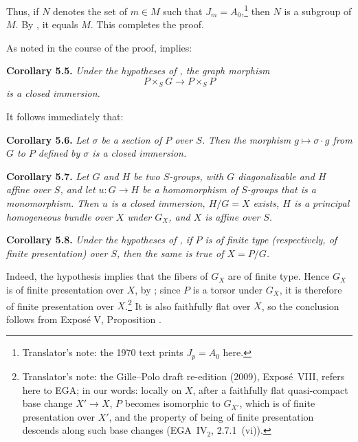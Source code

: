 Thus, if \(N\) denotes the set of \(m\in M\) such that
\(J_m=A_0\),\footnote{Translator's note: the 1970 text prints \(J_p=A_0\) here.} then
\(N\) is a subgroup of \(M\). By
, it equals \(M\). This
completes the proof.

As noted in the course of the proof,
 implies:

\medskip
\noindent{}\textbf{Corollary 5.5.}
\textit{Under the hypotheses of
, the graph morphism}
\[
  P\times_SG\longrightarrow P\times_SP
\]
\textit{is a closed immersion.}

It follows immediately that:

\medskip
\noindent{}\textbf{Corollary 5.6.}
\textit{Let \(\sigma\) be a section of \(P\) over \(S\). Then the
morphism \(g\mapsto\sigma\cdot g\) from \(G\) to \(P\) defined by
\(\sigma\) is a closed immersion.}

\medskip
\noindent{}\textbf{Corollary 5.7.}
\textit{Let \(G\) and \(H\) be two \(S\)-groups, with \(G\)
diagonalizable and \(H\) affine over \(S\), and let \(u:G\to H\) be a
homomorphism of \(S\)-groups that is a monomorphism. Then \(u\) is a
closed immersion, \(H/G=X\) exists, \(H\) is a principal homogeneous
bundle over \(X\) under \(G_X\), and \(X\) is affine over \(S\).}

\medskip
\noindent{}\textbf{Corollary 5.8.}
\textit{Under the hypotheses of
, if \(P\) is of finite type
(respectively, of finite presentation) over \(S\), then the same is
true of \(X=P/G\).}

Indeed, the hypothesis implies that the fibers of \(G_X\) are of finite
type. Hence \(G_X\) is of finite presentation over \(X\), by
; since \(P\) is a torsor
under \(G_X\), it is therefore of finite presentation over
\(X\).\footnote{Translator's note: the Gille--Polo draft re-edition (2009), Expos\'e~VIII, refers
here to EGA; in our words: locally on \(X\), after a faithfully flat quasi-compact base change
\(X'\to X\), \(P\) becomes isomorphic to \(G_{X'}\), which is of finite presentation over \(X'\), and
the property of being of finite presentation descends along such base changes (EGA~IV\(_2\),
2.7.1~(vi)).}
It is also faithfully flat over \(X\), so the conclusion follows from
Expos\'e V, Proposition .
